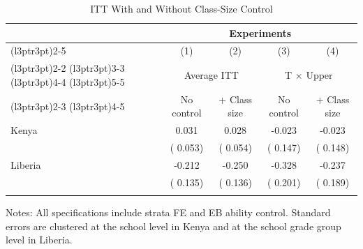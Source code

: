 \begin{table}[H]
\centering
\caption{ITT With and Without Class-Size Control}
\label{tab:classsize_diag}
\begin{threeparttable}
\begin{tabular}[t]{lcccc}
\toprule
\multicolumn{1}{c}{ } & \multicolumn{4}{c}{Experiments} \\
\cmidrule(l{3pt}r{3pt}){2-5}
\multicolumn{1}{c}{ } & \multicolumn{1}{c}{(1)} & \multicolumn{1}{c}{(2)} & \multicolumn{1}{c}{(3)} & \multicolumn{1}{c}{(4)} \\
\cmidrule(l{3pt}r{3pt}){2-2} \cmidrule(l{3pt}r{3pt}){3-3} \cmidrule(l{3pt}r{3pt}){4-4} \cmidrule(l{3pt}r{3pt}){5-5}
 & \multicolumn{2}{c}{Average ITT} & \multicolumn{2}{c}{T $\times$ Upper} \\
\cmidrule(l{3pt}r{3pt}){2-3} \cmidrule(l{3pt}r{3pt}){4-5}
 & No control & + Class size & No control & + Class size \\
\midrule
Kenya &   0.031 &   0.028 &  -0.023 &  -0.023 \\
 & (  0.053) & (  0.054) & (  0.147) & (  0.148) \\
\addlinespace
Liberia &  -0.212 &  -0.250 &  -0.328 &  -0.237 \\
 & (  0.135) & (  0.136) & (  0.201) & (  0.189) \\
\addlinespace
\bottomrule
\end{tabular}
\begin{tablenotes}[para]
\item Notes: All specifications include strata FE and EB ability control. Standard errors are clustered at the school level in Kenya and at the school grade group level in Liberia.
\end{tablenotes}
\end{threeparttable}
\end{table}
